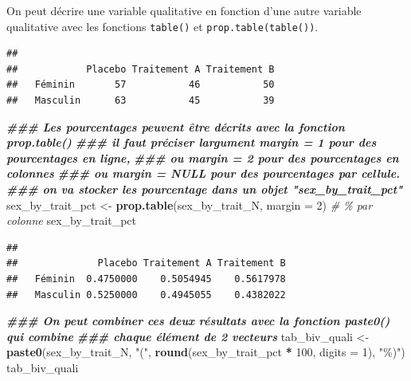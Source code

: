\documentclass[
]{book}
\newenvironment{Shaded}{\begin{snugshade}}{\end{snugshade}}
\newcommand{\AttributeTok}[1]{\textcolor[rgb]{0.13,0.29,0.53}{#1}}
\newcommand{\CommentTok}[1]{\textcolor[rgb]{0.56,0.35,0.01}{\textit{#1}}}
\newcommand{\DecValTok}[1]{\textcolor[rgb]{0.00,0.00,0.81}{#1}}
\newcommand{\DocumentationTok}[1]{\textcolor[rgb]{0.56,0.35,0.01}{\textbf{\textit{#1}}}}
\newcommand{\FunctionTok}[1]{\textcolor[rgb]{0.13,0.29,0.53}{\textbf{#1}}}
\newcommand{\NormalTok}[1]{#1}
\newcommand{\OtherTok}[1]{\textcolor[rgb]{0.56,0.35,0.01}{#1}}
\newcommand{\SpecialCharTok}[1]{\textcolor[rgb]{0.81,0.36,0.00}{\textbf{#1}}}
\newcommand{\StringTok}[1]{\textcolor[rgb]{0.31,0.60,0.02}{#1}}
\begin{document}
On peut décrire une variable qualitative en fonction d'une autre variable qualitative avec les fonctions \texttt{table()} et \texttt{prop.table(table())}.

\begin{Shaded}
\end{Shaded}

\begin{verbatim}
##           
##            Placebo Traitement A Traitement B
##   Féminin       57           46           50
##   Masculin      63           45           39
\end{verbatim}

\begin{Shaded}
\begin{Highlighting}[]
\DocumentationTok{\#\#\# Les pourcentages peuvent être décrits avec la fonction prop.table()}
\DocumentationTok{\#\#\# il faut préciser l\textquotesingle{}argument margin = 1 pour des pourcentages en ligne,}
\DocumentationTok{\#\#\# ou margin = 2 pour des pourcentages en colonnes }
\DocumentationTok{\#\#\# ou margin = NULL pour des pourcentages par cellule.}
\DocumentationTok{\#\#\# on va stocker les pourcentage dans un objet "sex\_by\_trait\_pct"}
\NormalTok{sex\_by\_trait\_pct }\OtherTok{\textless{}{-}} \FunctionTok{prop.table}\NormalTok{(sex\_by\_trait\_N,}
                               \AttributeTok{margin =} \DecValTok{2}\NormalTok{) }\CommentTok{\#  \% par colonne }
\NormalTok{sex\_by\_trait\_pct}
\end{Highlighting}
\end{Shaded}

\begin{verbatim}
##           
##              Placebo Traitement A Traitement B
##   Féminin  0.4750000    0.5054945    0.5617978
##   Masculin 0.5250000    0.4945055    0.4382022
\end{verbatim}

\begin{Shaded}
\begin{Highlighting}[]
\DocumentationTok{\#\#\# On peut combiner ces deux résultats avec la fonction paste0() qui combine}
\DocumentationTok{\#\#\# chaque élément de 2 vecteurs}
\NormalTok{tab\_biv\_quali }\OtherTok{\textless{}{-}} \FunctionTok{paste0}\NormalTok{(sex\_by\_trait\_N, }
                        \StringTok{"("}\NormalTok{, }\FunctionTok{round}\NormalTok{(sex\_by\_trait\_pct }\SpecialCharTok{*} \DecValTok{100}\NormalTok{, }\AttributeTok{digits =} \DecValTok{1}\NormalTok{), }\StringTok{"\%)"}\NormalTok{)}
\NormalTok{tab\_biv\_quali}
\end{Highlighting}
\end{Shaded}
\end{document}
